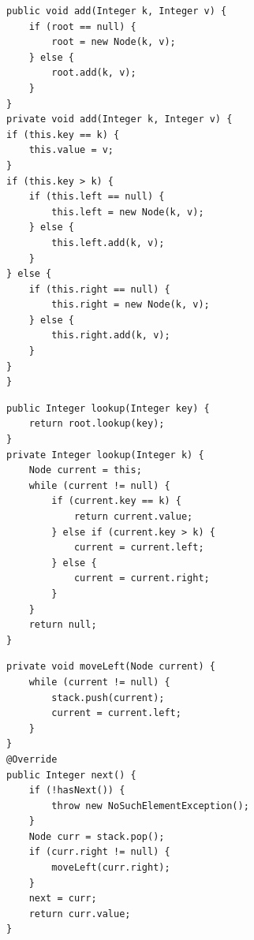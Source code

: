 \documentclass[a4paper,11pt]{article}
\newenvironment{code}{\captionsetup{type=listing}}{}
\begin{document}
\begin{code}
    \label{code:add}
    \begin{verbatim}
public void add(Integer k, Integer v) {
    if (root == null) {
        root = new Node(k, v);
    } else {
        root.add(k, v);
    }
}        
private void add(Integer k, Integer v) {
if (this.key == k) {
    this.value = v;
}
if (this.key > k) {
    if (this.left == null) {
        this.left = new Node(k, v);
    } else {
        this.left.add(k, v);
    }
} else {
    if (this.right == null) {
        this.right = new Node(k, v);
    } else {
        this.right.add(k, v);
    }
}
}
\end{verbatim}
\end{code}
\begin{code}
    \label{code:lookup}
    \begin{verbatim}
public Integer lookup(Integer key) {
    return root.lookup(key);
}
private Integer lookup(Integer k) {
    Node current = this;
    while (current != null) {
        if (current.key == k) {
            return current.value;
        } else if (current.key > k) {
            current = current.left;
        } else {
            current = current.right;
        }
    }
    return null;
}
\end{verbatim}
\end{code}

\begin{code}
    \label{code:iterator}
    \begin{verbatim}
private void moveLeft(Node current) {
    while (current != null) {
        stack.push(current);
        current = current.left;
    }
}
@Override
public Integer next() {
    if (!hasNext()) {
        throw new NoSuchElementException();
    }
    Node curr = stack.pop();
    if (curr.right != null) {
        moveLeft(curr.right);
    }
    next = curr;
    return curr.value;
}
\end{verbatim}
\end{code}
\end{document}
